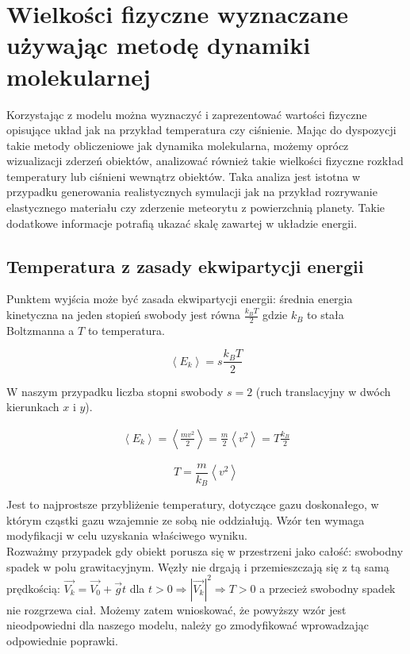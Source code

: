 \documentclass[12pt, letterpaper]{report}
\begin{document}
    \section{Wielkości fizyczne wyznaczane używając metodę dynamiki molekularnej}
    Korzystając z modelu można wyznaczyć i zaprezentować wartości fizyczne opisujące układ jak 
    na przykład temperatura czy ciśnienie. Mając do dyspozycji takie metody obliczeniowe jak dynamika 
    molekularna, możemy oprócz wizualizacji zderzeń obiektów, analizować również takie wielkości fizyczne rozkład
    temperatury lub ciśnieni wewnątrz obiektów. Taka analiza jest istotna w przypadku generowania
    realistycznych symulacji jak na przykład rozrywanie elastycznego materiału czy 
    zderzenie meteorytu z powierzchnią planety. Takie dodatkowe informacje potrafią ukazać skalę 
    zawartej w układzie energii.

    \subsection{Temperatura z zasady ekwipartycji energii}
    Punktem wyjścia może być zasada ekwipartycji energii: średnia energia kinetyczna na jeden stopień swobody jest równa 
    $\frac{k_{B}T}{2}$ gdzie $k_{B}$ to stała Boltzmanna a $T$ to temperatura.

    \begin{equation}
        \left< E_{k} \right> = s \frac{k_{B}T}{2}
    \end{equation}

    W naszym przypadku liczba stopni swobody $s = 2$ (ruch translacyjny w dwóch kierunkach $x$ i $y$).

    \begin{align*}
        \left< E_{k} \right> = \left< \frac{m v^{2}}{2} \right> = \frac{m}{2} \left< v^{2} \right> = T \frac{k_{B}}{2}
    \end{align*}

    \begin{equation}
        T = \frac{m}{k_{B}} \left< v^{2} \right>
    \end{equation}

    Jest to najprostsze przybliżenie temperatury, dotyczące gazu doskonałego, w którym cząstki gazu 
    wzajemnie ze sobą nie oddziałują. Wzór ten wymaga modyfikacji w celu uzyskania właściwego wyniku. \\

    Rozważmy przypadek gdy obiekt porusza się w przestrzeni jako całość: swobodny spadek w polu grawitacyjnym.
    Węzły nie drgają i przemieszczają się z tą samą prędkością:
    $\vec{V_k} = \vec{V_0} + \vec{g}t$ dla $t > 0  \Rightarrow  |\vec{V_k}|^2  \Rightarrow  T > 0$ a 
    przecież swobodny spadek nie rozgrzewa ciał. 
    Możemy zatem wnioskować, że powyższy wzór jest nieodpowiedni dla naszego modelu, 
    należy go zmodyfikować wprowadzając odpowiednie poprawki.
    
\end{document}
